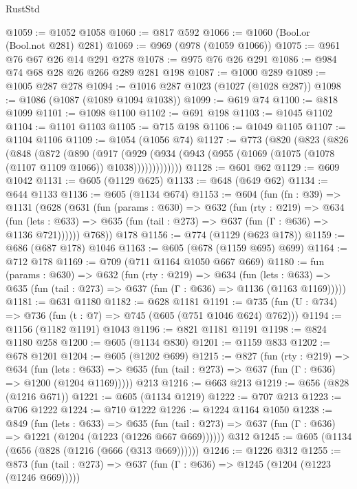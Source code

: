 \begin{lexlean}{RustStd}
\begin{coremodule}
@1059 := @1052 @1058
@1060 := @817 @592
@1066 := @1060 (Bool.or (Bool.not @281) @281)
@1069 := @969 (@978 (@1059 @1066))
@1075 := @961 @76 @67 @26 @14 @291 @278
@1078 := @975 @76 @26 @291
@1086 := @984 @74 @68 @28 @26 @266 @289 @281 @198
@1087 := @1000 @289
@1089 := @1005 @287 @278
@1094 := @1016 @287 @1023 (@1027 (@1028 @287))
@1098 := @1086 (@1087 (@1089 @1094 @1038))
@1099 := @619 @74
@1100 := @818 @1099
@1101 := @1098 @1100
@1102 := @691 @198
@1103 := @1045 @1102
@1104 := @1101 @1103
@1105 := @715 @198
@1106 := @1049 @1105
@1107 := @1104 @1106
@1109 := @1054 (@1056 @74)
@1127 := @773
    (@820
      (@823
        (@826
          (@848
            (@872
              (@890
                (@917
                  (@929
                    (@934 (@943 (@955 (@1069 (@1075 (@1078 (@1107 @1109 @1066)) @1038)))))))))))))
@1128 := @601 @62
@1129 := @609 @1042
@1131 := @605 (@1129 @625)
@1133 := @648 (@649 @62)
@1134 := @644 @1133
@1136 := @605 (@1134 @674)
@1153 := @604
    (fun (fn : @39) =>
    @1131
      (@628
        (@631
          (fun (params : @630) =>
          @632
            (fun (rty : @219) =>
            @634
              (fun (lets : @633) =>
              @635 (fun (tail : @273) => @637 (fun (Γ : @636) => @1136 @721))))))
        @768))
    @178
@1156 := @774 (@1129 (@623 @178))
@1159 := @686 (@687 @178) @1046
@1163 := @605 (@678 (@1159 @695) @699)
@1164 := @712 @178
@1169 := @709 (@711 @1164 @1050 @667 @669)
@1180 := fun (params : @630) =>
  @632
    (fun (rty : @219) =>
    @634
      (fun (lets : @633) =>
      @635 (fun (tail : @273) => @637 (fun (Γ : @636) => @1136 (@1163 @1169)))))
@1181 := @631 @1180
@1182 := @628 @1181
@1191 := @735 (fun (U : @734) => @736 (fun (t : @7) => @745 (@605 (@751 @1046 @624) @762)))
@1194 := @1156 (@1182 @1191) @1043
@1196 := @821 @1181 @1191
@1198 := @824 @1180 @258
@1200 := @605 (@1134 @830)
@1201 := @1159 @833
@1202 := @678 @1201
@1204 := @605 (@1202 @699)
@1215 := @827
    (fun (rty : @219) =>
    @634
      (fun (lets : @633) =>
      @635 (fun (tail : @273) => @637 (fun (Γ : @636) => @1200 (@1204 @1169)))))
    @213
@1216 := @663 @213
@1219 := @656 (@828 (@1216 @671))
@1221 := @605 (@1134 @1219)
@1222 := @707 @213
@1223 := @706 @1222
@1224 := @710 @1222
@1226 := @1224 @1164 @1050
@1238 := @849
    (fun (lets : @633) =>
    @635 (fun (tail : @273) => @637 (fun (Γ : @636) => @1221 (@1204 (@1223 (@1226 @667 @669))))))
    @312
@1245 := @605 (@1134 (@656 (@828 (@1216 (@666 (@313 @669))))))
@1246 := @1226 @312
@1255 := @873
    (fun (tail : @273) => @637 (fun (Γ : @636) => @1245 (@1204 (@1223 (@1246 @669)))))

\end{coremodule}
\end{lexlean}

